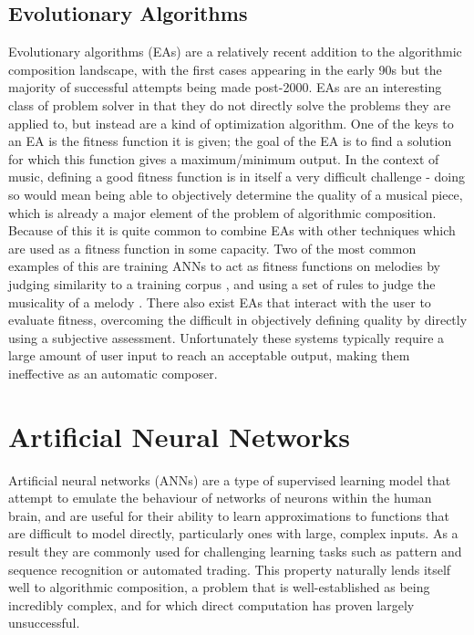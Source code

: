 \documentclass[ author={Stephen Livermore-Tozer},
				supervisor={Dr. Peter Flach},
				degree={MEng},
				title={Algorithmic Co-composition Using Machine Learning},
				subtitle={},
				type={research},
				year={2016} ]{dissertation}
\begin{document}
	\subsection{Evolutionary Algorithms}
	\label{sec:evolutionary-algorithms}
	
	Evolutionary algorithms (EAs) are a relatively recent addition to the algorithmic composition landscape, with the first cases appearing in the early 90s but the majority of successful attempts being made post-2000. EAs are an interesting class of problem solver in that they do not directly solve the problems they are applied to, but instead are a kind of optimization algorithm. One of the keys to an EA is the fitness function it is given; the goal of the EA is to find a solution for which this function gives a maximum/minimum output. In the context of music, defining a good fitness function is in itself a very difficult challenge - doing so would mean being able to objectively determine the quality of a musical piece, which is already a major element of the problem of algorithmic composition. Because of this it is quite common to combine EAs with other techniques which are used as a fitness function in some capacity. Two of the most common examples of this are training ANNs to act as fitness functions on melodies by judging similarity to a training corpus \cite{burton1998hybrid,gibson1991neurogen}, and using a set of rules to judge the musicality of a melody \cite{mcintyre1994bach}. There also exist EAs that interact with the user to evaluate fitness, overcoming the difficult in objectively defining quality by directly using a subjective assessment. Unfortunately these systems typically require a large amount of user input to reach an acceptable output, making them ineffective as an automatic composer. 
		
%	

	\section{Artificial Neural Networks}
	\label{sec:ann-overview}
	
	Artificial neural networks (ANNs) are a type of supervised learning model that attempt to emulate the behaviour of networks of neurons within the human brain, and are useful for their ability to learn approximations to functions that are difficult to model directly, particularly ones with large, complex inputs. As a result they are commonly used for challenging learning tasks such as pattern and sequence recognition or automated trading. This property naturally lends itself well to algorithmic composition, a problem that is well-established as being incredibly complex, and for which direct computation has proven largely unsuccessful. 
	
\end{document}
